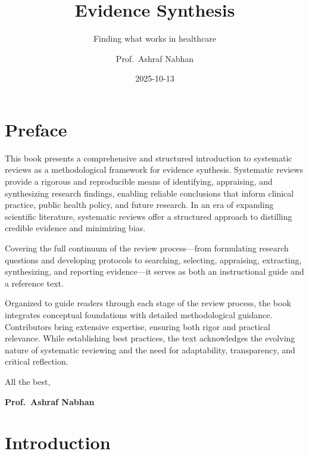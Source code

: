 \documentclass[
  11pt,
  a4paper,
  DIV=11,
  numbers=noendperiod]{scrreprt}
\title{Evidence Synthesis}
\subtitle{Finding what works in healthcare}
\author{Prof.~Ashraf Nabhan}
\date{2025-10-13}
\renewcommand*\contentsname{Table of contents}
\newcommand\contentsname{Table of contents}
\begin{document}
\maketitle

\renewcommand*\contentsname{On this page}
{
\hypersetup{linkcolor=}
\setcounter{tocdepth}{2}
\tableofcontents
}


\chapter*{Preface}\label{preface}


This book presents a comprehensive and structured introduction to
systematic reviews as a methodological framework for evidence synthesis.
Systematic reviews provide a rigorous and reproducible means of
identifying, appraising, and synthesizing research findings, enabling
reliable conclusions that inform clinical practice, public health
policy, and future research. In an era of expanding scientific
literature, systematic reviews offer a structured approach to distilling
credible evidence and minimizing bias.

Covering the full continuum of the review process---from formulating
research questions and developing protocols to searching, selecting,
appraising, extracting, synthesizing, and reporting evidence---it serves
as both an instructional guide and a reference text.

Organized to guide readers through each stage of the review process, the
book integrates conceptual foundations with detailed methodological
guidance. Contributors bring extensive expertise, ensuring both rigor
and practical relevance. While establishing best practices, the text
acknowledges the evolving nature of systematic reviewing and the need
for adaptability, transparency, and critical reflection.

All the best,

\textbf{Prof.~Ashraf Nabhan}


\chapter*{Introduction}\label{introduction}

\end{document}
